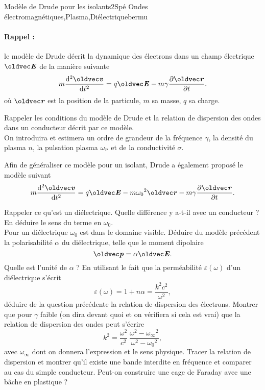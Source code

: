 
\begin{exercise}{Modèle de Drude pour les isolants}{2}{Spé}
{Ondes électromagnétiques,Plasma,Diélectrique}{bermu}

\paragraph{Rappel :} le modèle de Drude décrit la dynamique des électrons dans un champ électrique $\vE$ de la manière suivante
$$m\dv[2]{\vv}{t} = q\vE - m\gamma\pdv{\vr}{t}.$$
où $\vr$ est la position de la particule, $m$ sa masse, $q$ sa charge.
\begin{questions}
    \questioncours Rappeler les conditions du modèle de Drude et la relation de dispersion des ondes dans un conducteur décrit par ce modèle.\\
    On introduira et estimera un ordre de grandeur de la fréquence $\gamma$, la densité du plasma $n$, la pulsation plasma $\omega_\textsc{p}$ et de la conductivité $\sigma$.
\begin{EnvUplevel}
    Afin de généraliser ce modèle pour un isolant, Drude a également proposé le modèle suivant
    $$m\dv[2]{\vv}{t} = q\vE -m{\omega_0}^2\vr - m\gamma\pdv{\vr}{t}.$$
\end{EnvUplevel}
    \question Rappeler ce qu'est un diélectrique. Quelle différence y a-t-il avec un conducteur ? En déduire le sens du terme en $\omega_0$. \\
    Pour un diélectrique $\omega_0$ est dans le domaine visible.
    \question Déduire du modèle précédent la polarisabilité $\alpha$ du diélectrique, telle que le moment dipolaire
    $$\vp = \alpha\vE.$$
    Quelle est l'unité de $\alpha$ ?
    \question En utilisant le fait que la perméabilité $\varepsilon(\omega)$ d'un diélectrique s'écrit
    $$\varepsilon(\omega) = 1 + n\alpha = \dfrac{k^2c^2}{\omega^2},$$
    déduire de la question précédente la relation de dispersion des électrons.
    \question Montrer que pour $\gamma$ faible (on dira devant quoi et on vérifiera si cela est vrai) que la relation de dispersion des ondes peut s'écrire
    $$k^2 = \dfrac{\omega^2}{c^2}\:\dfrac{\omega^2 - {\omega_\infty}^2}{\omega^2 - {\omega_0}^2},$$
    avec $\omega_\infty$ dont on donnera l'expression et le sens physique.
    \question Tracer la relation de dispersion et montrer qu'il existe une bande interdite en fréquence et comparer au cas du simple conducteur.
    \question Peut-on construire une cage de Faraday avec une bâche en plastique ?
\end{questions}


\end{exercise}
